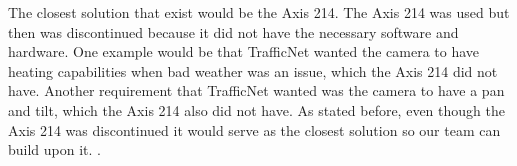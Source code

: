 The closest solution that exist would be the Axis 214. The Axis 214 was used but then was discontinued because it did not have the necessary software and hardware. One example would be that TrafficNet wanted the camera to have heating capabilities when bad weather was an issue, which the Axis 214 did not have. Another requirement that TrafficNet wanted was the camera to have a pan and tilt, which the Axis 214 also did not have. As stated before, even though the Axis 214 was discontinued it would serve as the closest solution so our team can build upon it. \cite{Rubin2012}.
